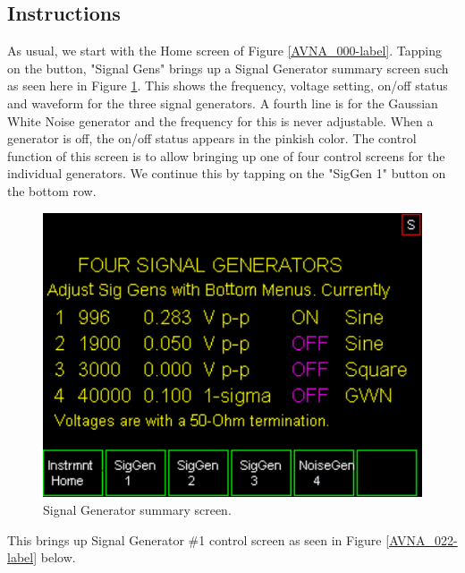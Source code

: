 \subsection{Instructions}
\label{subsect:ASGInstr}
As usual, we start with the Home screen of Figure  \ref{AVNA_000-label}.    Tapping on the button, "Signal Gens" brings up a Signal Generator summary screen such as seen here in Figure \ref{AVNA_021-label}.  This shows the frequency, voltage setting, on/off status and waveform for the three signal generators.  A fourth line is for the Gaussian White Noise generator and the frequency for this is never adjustable.  When a generator is off, the on/off status appears in the pinkish color.  The control function of this screen is to allow bringing up one of four control screens for the individual generators.  We continue this by tapping on the "SigGen 1" button on the bottom row.
%
\begin{figure}[H]
\begin{center}
\includegraphics[scale=0.75]{./images/AVNA_021.pdf}
\caption{Signal Generator summary screen. }
\label{AVNA_021-label}
\end{center}
\end{figure}
%
This brings up Signal Generator \#1 control screen as seen in Figure  \ref{AVNA_022-label} below.
%
